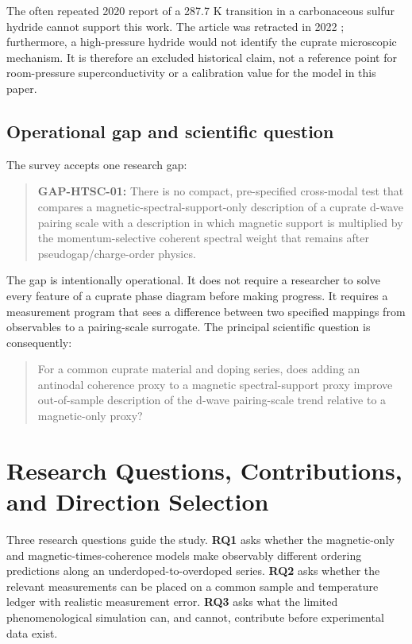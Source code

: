 \documentclass[conference]{IEEEtran}
\begin{document}
The often repeated 2020 report of a 287.7 K transition in a carbonaceous sulfur hydride cannot support this work. The article was retracted in 2022 \cite{snider2020}; furthermore, a high-pressure hydride would not identify the cuprate microscopic mechanism. It is therefore an excluded historical claim, not a reference point for room-pressure superconductivity or a calibration value for the model in this paper.

\subsection{Operational gap and scientific question}

The survey accepts one research gap:

\begin{quote}
\textbf{GAP-HTSC-01:} There is no compact, pre-specified cross-modal test that compares a magnetic-spectral-support-only description of a cuprate d-wave pairing scale with a description in which magnetic support is multiplied by the momentum-selective coherent spectral weight that remains after pseudogap/charge-order physics.
\end{quote}

The gap is intentionally operational. It does not require a researcher to solve every feature of a cuprate phase diagram before making progress. It requires a measurement program that sees a difference between two specified mappings from observables to a pairing-scale surrogate. The principal scientific question is consequently:

\begin{quote}
For a common cuprate material and doping series, does adding an antinodal coherence proxy to a magnetic spectral-support proxy improve out-of-sample description of the d-wave pairing-scale trend relative to a magnetic-only proxy?
\end{quote}

\section{Research Questions, Contributions, and Direction Selection}

Three research questions guide the study. \textbf{RQ1} asks whether the magnetic-only and magnetic-times-coherence models make observably different ordering predictions along an underdoped-to-overdoped series. \textbf{RQ2} asks whether the relevant measurements can be placed on a common sample and temperature ledger with realistic measurement error. \textbf{RQ3} asks what the limited phenomenological simulation can, and cannot, contribute before experimental data exist.
\end{document}
